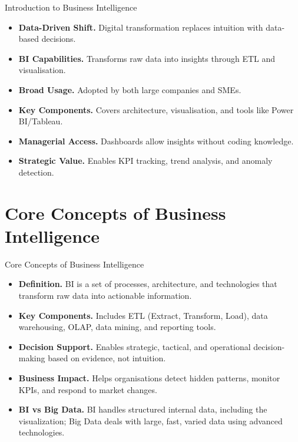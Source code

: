 \documentclass[aspectratio=169, table]{beamer}
\begin{document}
\begin{frame}{Introduction to Business Intelligence}
	\vspace{20pt}
	\begin{itemize}
		\item \textbf{Data-Driven Shift.} Digital transformation replaces intuition with data-based decisions.
		\item \textbf{BI Capabilities.} Transforms raw data into insights through ETL and visualisation.
		\item \textbf{Broad Usage.} Adopted by both large companies and SMEs.
		\item \textbf{Key Components.} Covers architecture, visualisation, and tools like Power BI/Tableau.
		\item \textbf{Managerial Access.} Dashboards allow insights without coding knowledge.
		\item \textbf{Strategic Value.} Enables KPI tracking, trend analysis, and anomaly detection.
	\end{itemize}
\end{frame}

\section{Core Concepts of Business Intelligence}

\begin{frame}{Core Concepts of Business Intelligence}
	\vspace{20pt}
	\begin{itemize}
		\item \textbf{Definition.} BI is a set of processes, architecture, and technologies that transform raw data into actionable information.
		\item \textbf{Key Components.} Includes ETL (Extract, Transform, Load), data warehousing, OLAP, data mining, and reporting tools.
		\item \textbf{Decision Support.} Enables strategic, tactical, and operational decision-making based on evidence, not intuition.
		\item \textbf{Business Impact.} Helps organisations detect hidden patterns, monitor KPIs, and respond to market changes.
		\item \textbf{BI vs Big Data.} BI handles structured internal data, including the visualization; Big Data deals with large, fast, varied data using advanced technologies.
	\end{itemize}
\end{frame}
\end{document}
